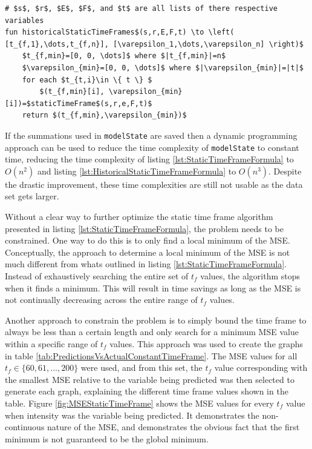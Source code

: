 \begin{minipage}{\linewidth}
\begin{lstlisting}[caption={The algorithm that describes how to find historical static time frames.},label={lst:HistoricalStaticTimeFrameFormula},mathescape=true]
# $s$, $r$, $E$, $F$, and $t$ are all lists of there respective variables
fun historicalStaticTimeFrames$(s,r,E,F,t) \to \left( [t_{f,1},\dots,t_{f,n}], [\varepsilon_1,\dots,\varepsilon_n] \right)$
    $t_{f,min}=[0, 0, \dots]$ where $|t_{f,min}|=n$
    $\varepsilon_{min}=[0, 0, \dots]$ where $|\varepsilon_{min}|=|t|$
    for each $t_{t,i}\in \{ t \} $
        $(t_{f,min}[i], \varepsilon_{min}[i])=$staticTimeFrame$(s,r,e,F,t)$
    return $(t_{f,min},\varepsilon_{min})$
\end{lstlisting}
\end{minipage}

If the summations used in \texttt{modelState} are saved then a dynamic programming approach can be used to reduce the time complexity of \texttt{modelState} to constant time, reducing the time complexity of listing \ref{lst:StaticTimeFrameFormula} to $O(n^2)$ and listing \ref{lst:HistoricalStaticTimeFrameFormula} to $O(n^3)$. Despite the drastic improvement, these time complexities are still not usable as the data set gets larger.

Without a clear way to further optimize the static time frame algorithm presented in listing \ref{lst:StaticTimeFrameFormula}, the problem needs to be constrained. One way to do this is to only find a local minimum of the MSE. Conceptually, the approach to determine a local minimum of the MSE is not much different from whats outlined in listing \ref{lst:StaticTimeFrameFormula}. Instead of exhaustively searching the entire set of $t_f$ values, the algorithm stops when it finds a minimum. This will result in time savings as long as the MSE is not continually decreasing across the entire range of $t_f$ values.

Another approach to constrain the problem is to simply bound the time frame to always be less than a certain length and only search for a minimum MSE value within a specific range of $t_f$ values. This approach was used to create the graphs in table \ref{tab:PredictionsVsActualConstantTimeFrame}. The MSE values for all $t_f\in \{ 60, 61, ... , 200 \}$ were used, and from this set, the $t_f$ value corresponding with the smallest MSE relative to the variable being predicted was then selected to generate each graph, explaining the different time frame values shown in the table. Figure \ref{fig:MSEStaticTimeFrame} shows the MSE values for every $t_f$ value when intensity was the variable being predicted. It demonstrates the non-continuous nature of the MSE, and demonstrates the obvious fact that the first minimum is not guaranteed to be the global minimum.

